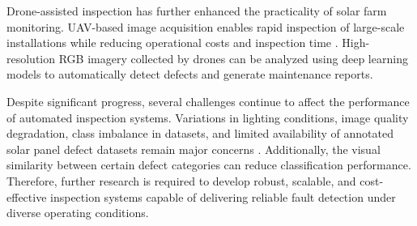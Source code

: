 Drone-assisted inspection has further enhanced the practicality of solar farm monitoring. UAV-based image acquisition enables rapid inspection of large-scale installations while reducing operational costs and inspection time \cite{ref28}. High-resolution RGB imagery collected by drones can be analyzed using deep learning models to automatically detect defects and generate maintenance reports.

Despite significant progress, several challenges continue to affect the performance of automated inspection systems. Variations in lighting conditions, image quality degradation, class imbalance in datasets, and limited availability of annotated solar panel defect datasets remain major concerns \cite{ref26,ref27}. Additionally, the visual similarity between certain defect categories can reduce classification performance. Therefore, further research is required to develop robust, scalable, and cost-effective inspection systems capable of delivering reliable fault detection under diverse operating conditions.

